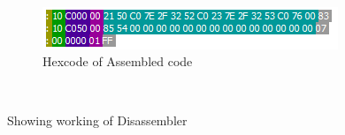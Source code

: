 \begin{figure}[htbp]
		\\        \vspace{20pt}
       \begin{subfigure}[b]{0.5\textwidth}
                       \includegraphics[width=\textwidth]{sampleCode1Hex}
                       \caption{Hexcode of Assembled code}
                       \label{fig:s1hex}
               \end{subfigure}    
         \\ \vspace{20pt}          
   \caption{Showing working of Disassembler}
\end{figure}